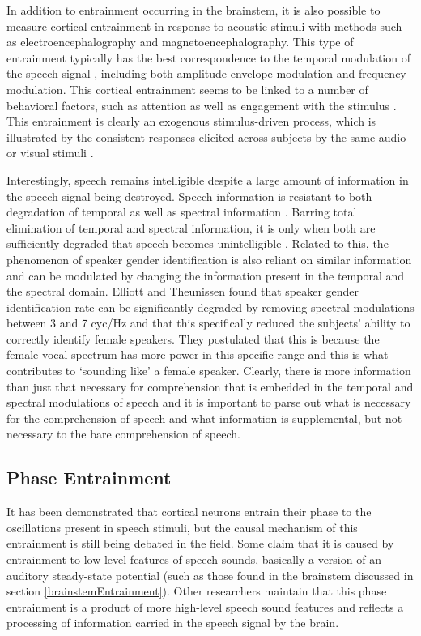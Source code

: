 \documentclass[titlepage]{article}
\begin{document}
  In addition to entrainment occurring in the brainstem, it is also possible to measure cortical
  entrainment in response to acoustic stimuli with methods such as electroencephalography and
  magnetoencephalography. This type of entrainment typically has the best correspondence to the
  temporal modulation of the speech signal \cite{Ding2014a,Ding2014,Nourski2009,Horton2014},
  including both amplitude envelope modulation and frequency modulation. This cortical entrainment
  seems to be linked to a number of behavioral factors, such as attention
  \cite{Dmochowski2016,ZionGolumbic2013} as well as engagement with the stimulus \cite{Dmochowski2017}.
  This entrainment is clearly an exogenous stimulus-driven process, which is illustrated by the
  consistent responses elicited across subjects by the same audio or visual stimuli
  \cite{Cohen2017,Petroni2017}.

  Interestingly, speech remains intelligible despite a large amount of information in the speech
  signal being destroyed. Speech information is resistant to both degradation of temporal as well
  as spectral information \cite{Silipo1999,Drullman1994}. Barring total elimination of temporal
  and spectral information, it is only when both are sufficiently degraded that speech becomes
  unintelligible \cite{Elliott2009}. Related to this, the phenomenon of speaker gender identification
  is also reliant on similar information and can be modulated by changing the information present
  in the temporal and the spectral domain. Elliott and Theunissen \cite{Elliott2009} found that speaker
  gender identification rate can be significantly degraded by removing spectral modulations between 3 and
  7 cyc/Hz and that this specifically reduced the subjects' ability to correctly identify female speakers.
  They postulated that this is because the female vocal spectrum has more power in this specific range and
  this is what contributes to `sounding like' a female speaker. Clearly, there is more information than
  just that necessary for comprehension that is embedded in the temporal and spectral modulations of speech
  and it is important to parse out what is necessary for the comprehension of speech and what information
  is supplemental, but not necessary to the bare comprehension of speech.

  \subsection{Phase Entrainment}

    It has been demonstrated that cortical neurons entrain their phase to the oscillations present
    in speech stimuli, but the causal mechanism of this entrainment is still being debated in the field.
    Some claim that it is caused by entrainment to low-level features of speech sounds, basically a
    version of an auditory steady-state potential (such as those found in the brainstem discussed in
    section \ref{brainstemEntrainment}). Other researchers maintain that this phase entrainment is a
    product of more high-level speech sound features and reflects a processing of information
    carried in the speech signal by the brain.
\end{document}
